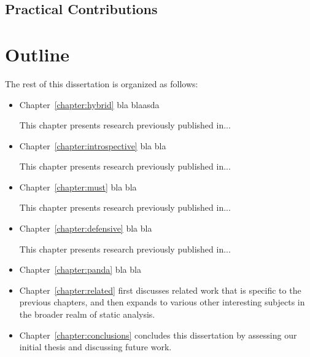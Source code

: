 \subsection{Practical Contributions}


\section{Outline}

The rest of this dissertation is organized as follows:
\begin{itemize}%
\item Chapter~\ref{chapter:hybrid} bla blaasda

    This chapter presents research previously published in...

\item Chapter~\ref{chapter:introspective} bla bla

    This chapter presents research previously published in...

\item Chapter~\ref{chapter:must} bla bla

    This chapter presents research previously published in...

\item Chapter~\ref{chapter:defensive} bla bla

    This chapter presents research previously published in...
    
\item Chapter~\ref{chapter:panda} bla bla

\item Chapter~\ref{chapter:related} first discusses related work that
  is specific to the previous chapters, and then expands to various
  other interesting subjects in the broader realm of static analysis.

\item Chapter~\ref{chapter:conclusions} concludes this dissertation by assessing our initial thesis and discussing future work.
\end{itemize}